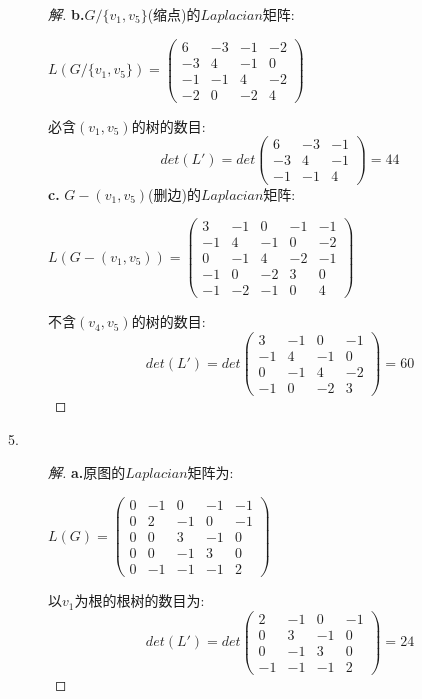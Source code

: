 \documentclass[UTF8, onecolumn, a4paper]{article}
\begin{document}
\begin{description}
\begin{proof}[解]
\textbf{b.}$G/\{v_1,v_5\}$(缩点)的$Laplacian$矩阵:
\begin{center}
	$L(G/\{v_1,v_5\})=\begin{pmatrix}
	6 & -3 & -1 & -2\\
	-3 & 4 & -1 & 0\\
	-1 & -1 & 4 & -2 \\
	-2 & 0 & -2 & 4 
	\end{pmatrix}$
\end{center}
必含$(v_1, v_5)$的树的数目:
$$det(L') = det\left(
\begin{array}{ccc}
6 & -3 & -1\\
-3 & 4 & -1\\
-1 & -1 & 4
\end{array}
\right) =44 $$
\textbf{c.} 
$G-(v_1,v_5)$(删边)的$Laplacian$矩阵:
\begin{center}
	$L(G-(v_1,v_5))=\begin{pmatrix}
	3 & -1 & 0 & -1 & -1\\
	-1 & 4 & -1 & 0 & -2\\
	0 & -1 & 4 & -2 & -1 \\
	-1 & 0 & -2 & 3 & 0 \\
	-1 & -2 & -1 & 0 & 4
	\end{pmatrix}$
\end{center}
不含$(v_4, v_5)$的树的数目:
$$det(L') = det\left(
\begin{array}{cccc}
3 & -1 & 0 & -1\\
-1 & 4 & -1 & 0\\
0 & -1 & 4 & -2 \\
-1 & 0 & -2 & 3
\end{array}
\right) =  60$$
\end{proof}

\item[5.]
\begin{proof}[解]
\textbf{a.}原图的$Laplacian$矩阵为:
\begin{center}
	$L(G) = \begin{pmatrix}
	0 & -1 & 0 & -1 & -1\\
	0 & 2 & -1 & 0 & -1\\
	0 & 0 & 3 & -1 & 0 \\
	0 & 0 & -1 & 3 & 0 \\
	0 & -1 & -1 & -1 & 2
	\end{pmatrix}$
\end{center}
以$v_1$为根的根树的数目为:
$$det(L') = det\left(
\begin{array}{cccc}
 2 & -1 & 0 & -1\\
 0 & 3 & -1 & 0 \\
 0 & -1 & 3 & 0 \\
 -1 & -1 & -1 & 2
\end{array}
\right) = 24$$


\end{proof}
\end{description}
\end{document}
